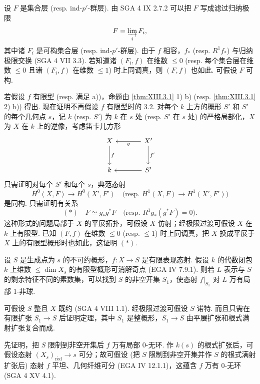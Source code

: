 设 $F$ 是集合层 (resp. ind-$p'$-群层). 由 SGA 4 IX 2.7.2 可以把 $F$ 写成滤过归纳极限
\[
F = \varinjlim_i F_i,
\]
其中诸 $F_i$ 是可构集合层 (resp. ind-$p'$-群层). 由于 $f$ 相容，$f_*$ (resp. $R^1 f_*$) 与归纳极限交换 (SGA 4 VII 3.3). 若知道诸 $(F_i, f)$ 在维数 $\leqslant 0$ (resp. 每个集合层在维数 $\leqslant 0$ 且诸 $(F_i, f)$ 在维数 $\leqslant 1$) 时上同调真，则 $(F, f)$ 也如此. 可假设 $F$ 可构.

若假设 $f$ 有限型 (resp. 满足 a))，命题由 \ref{thm:XIII.3.1} 1) b) (resp. \ref{thm:XIII.3.1} 2) b)) 得出. 现在证明不再假设 $f$ 有限型时的 3.2. 对每个 $k$ 上方的概形 $S'$ 和 $S'$ 的每个几何点 $s$，记 $k$ (resp. $S'$) 为 $k$ 在 $s$ 处 (resp. $S'$ 在 $s$ 处) 的严格局部化，$X$ 为 $X$ 在 $k$ 上的逆像，考虑笛卡儿方形
\[
\begin{tikzcd}[row sep=large, column sep=large]
X \arrow[d,"{f}"] & X' \arrow[l,"g"] \arrow[d,"{f'}"] \\
k & S' \arrow[l]
\end{tikzcd}
\]
只需证明对每个 $S'$ 和每个 $s$，典范态射
\[
H^0(X, F) \longrightarrow H^0(X', F') \quad \text{(resp. } H^1(X, F) \longrightarrow H^1(X', F')\text{)}
\]
是同构. 只需证明有关系
\[
(\ast) \quad F \simeq g_* g^{*} F \quad \text{(resp. } R^1 g_*(g^{*} F) = 0\text{)}.
\]
这种形式的问题局部于 $X$ 的平展拓扑，可假设 $X$ 仿射；经极限过渡可假设 $X$ 在 $k$ 上有限型. 已知 $(F, f)$ 在维数 $\leqslant 0$ (resp. $\leqslant 1$) 时上同调真，把 $X$ 换成平展于 $X$ 上的有限型概形时也如此，这证明 $(\ast)$.

\begin{theorem}\label{thm:XIII.3.3}
设 $S$ 是生成点为 $s$ 的不可约概形，$f \colon X \to S$ 是有限表现态射. 假设 $k$ 的代数闭包 $k$ 上维数 $\leqslant \dim X_s$ 的有限型概形可消解奇点 (EGA IV 7.9.1). 则若 $L$ 表示与 $S$ 的剩余特征不同的素数集，可以找到 $S$ 的非空开集 $S_1$，使态射 $f|_{S_1}$ 对 $L$ 万有局部 1-非球.
\end{theorem}

可假设 $S$ 整且 $X$ 既约 (SGA 4 VIII 1.1). 经极限过渡可假设 $S$ 诺特. 而且只需在有限扩张 $S_1 \to S$ 后证明定理，其中 $S_1$ 是整概形，$S_1 \to S$ 由平展扩张和根式满射扩张复合而成.

先证明，把 $S$ 限制到非空开集后 $f$ 万有局部 0-无环. 作 $k(s)$ 的根式扩张后，可假设态射 $(X_s)_{\mathrm{r\acute{e}d}} \to s$ 可分；故可假设 (把 $S$ 限制到非空开集并作 $S$ 的根式满射扩张后) 态射 $f$ 平坦、几何纤维可分 (EGA IV 12.1.1)，这蕴含 $f$ 万有 0-无环 (SGA 4 XV 4.1).

